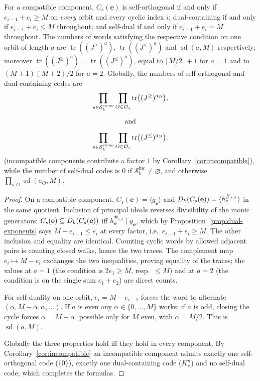\begin{proposition}\label{prop:extremal-counts}
For a compatible component, $C_s(\mathbf{e})$ is self-orthogonal if and only
if $e_{i-1}+e_i\geq M$ on \emph{every} orbit and every cyclic index $i$;
dual-containing if and only if $e_{i-1}+e_i\leq M$ throughout; and self-dual
if and only if $e_{i-1}+e_i=M$ throughout.  The numbers of words satisfying
the respective condition on one orbit of length $a$ are
$\operatorname{tr}((J^{\geq})^a)$, $\operatorname{tr}((J^{\leq})^a)$ and
$\operatorname{sd}(a,M)$ respectively; moreover
$\operatorname{tr}((J^{\geq})^a)=\operatorname{tr}((J^{\leq})^a)$, equal to
$\lfloor M/2\rfloor+1$ for $a=1$ and to $(M+1)(M+2)/2$ for $a=2$.
Globally, the numbers of self-orthogonal and dual-containing codes are
\[
\begin{gathered}
\prod_{s\in\mathcal{S}_k^{\mathrm{comp}}}
\prod_{O\in\mathcal O_s}
\operatorname{tr}\bigl((J^{\geq})^{a_O}\bigr),
\\[5pt]
\text{and}\\[5pt]
\prod_{s\in\mathcal{S}_k^{\mathrm{comp}}}
\prod_{O\in\mathcal O_s}
\operatorname{tr}\bigl((J^{\leq})^{a_O}\bigr).
\end{gathered}
\]
(incompatible components contribute a factor $1$ by
Corollary~\ref{cor:incompatible}), while the number of self-dual codes is $0$ if
$\mathcal{S}_k^{\mathrm{inc}}\neq\varnothing$, and otherwise
$\prod_{s,O}\operatorname{sd}(a_O,M)$.
\end{proposition}

\begin{proof}
On a compatible component, $C_s(\mathbf{e})=\langle g_{\mathbf{e}}\rangle$ and
$D_k(C_s(\mathbf{e}))=\langle h_{\mathbf{e}}^{\#_{s,k}}\rangle$ in the same
quotient.  Inclusion of principal ideals reverses divisibility of the monic
generators: $C_s(\mathbf{e})\subseteq D_k(C_s(\mathbf{e}))$ iff
$h_{\mathbf{e}}^{\#_{s,k}}\mid g_{\mathbf{e}}$, which by
Proposition~\ref{prop:dual-exponents} says $M-e_{i-1}\leq e_i$ at every factor,
i.e.\ $e_{i-1}+e_i\geq M$.  The other inclusion and equality are identical.
Counting cyclic words by allowed adjacent pairs is counting closed walks,
hence the two traces.  The complement map $e_i\mapsto M-e_i$ exchanges the two
inequalities, proving equality of the traces; the values at $a=1$ (the
condition is $2e_1\geq M$, resp.\ $\leq M$) and at $a=2$ (the condition is on
the single sum $e_1+e_2$) are direct counts.

For self-duality on one orbit, $e_i=M-e_{i-1}$ forces the word to alternate
$(\alpha,M-\alpha,\alpha,\ldots)$.  If $a$ is even any
$\alpha\in\{0,\ldots,M\}$ works; if $a$ is odd, closing the cycle forces
$\alpha=M-\alpha$, possible only for $M$ even, with $\alpha=M/2$.  This is
$\operatorname{sd}(a,M)$.

Globally the three properties hold iff they hold in every component.  By
Corollary~\ref{cor:incompatible} an incompatible component admits exactly one
self-orthogonal code ($\{0\}$), exactly one dual-containing code ($K_s^n$) and
no self-dual code, which completes the formulas.
\end{proof}

